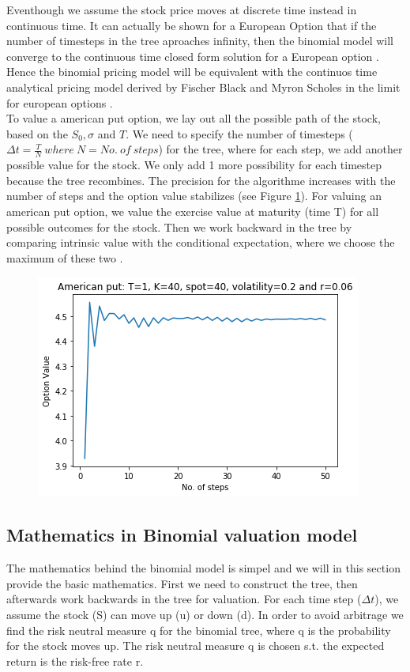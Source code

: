 Eventhough we assume the stock price moves at discrete time instead in continuous time. It can actually be shown for a European Option that if the number of timesteps in the tree aproaches infinity, then the binomial model will converge to the continuous time closed form solution for a European option \parencite{binomial-Paper} \parencite{Hull}. Hence the binomial pricing model will be equivalent with the continuos time analytical pricing model derived by Fischer Black and Myron Scholes in the limit for european options \parencite{binomial-Paper}.\\

To value a american put option, we lay out all the possible path of the stock, based on the $S_0,\sigma$ and $T$. We need to specify the number of timesteps ($\Delta t = \frac{T}{N} \ where \ N=No. \ of  \ steps$) for the tree, where for each step, we add another possible value for the stock. We only add 1 more possibility for each timestep because the tree recombines. The precision for the algorithme increases with the number of steps and the option value stabilizes (see Figure \ref{fig:binConv}). For valuing an american put option, we value the exercise value at maturity (time T) for all possible outcomes for the stock. Then we work backward in the tree by comparing intrinsic value with the conditional expectation, where we choose the maximum of these two \parencite{Hull}. 
 
\begin{figure}[th]
\centering
\includegraphics{Figures/binConv.png}
\decoRule
\caption[Convergence of Binomial model]{}
\label{fig:binConv}
\end{figure}




\subsection{Mathematics in Binomial valuation model}
The mathematics behind the binomial model is simpel and we will in this section provide the basic mathematics. First we need to construct the tree, then afterwards work backwards in the tree for valuation. For each time step ($\Delta t$), we assume the stock (S) can move up (u) or down (d). In order to avoid arbitrage we find the risk neutral measure q for the binomial tree, where q is the probability for the stock moves up. The risk neutral measure q is chosen s.t. the expected return is the risk-free rate r.

